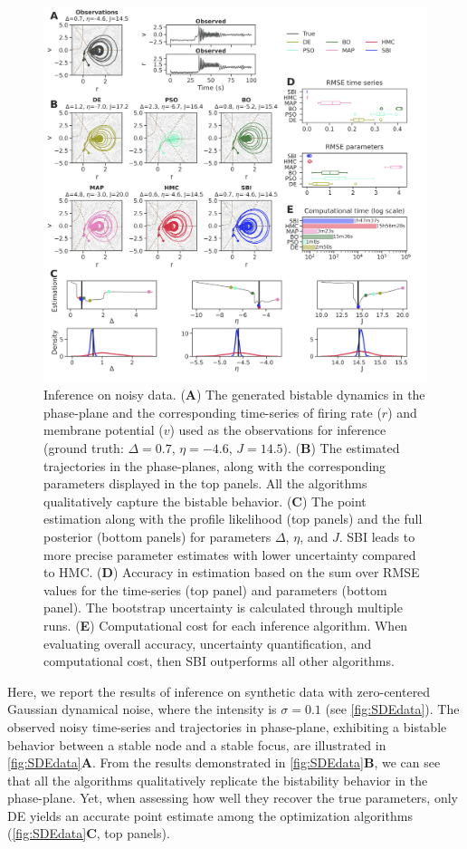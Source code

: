 \documentclass[preprint,11pt,authoryear]{elsarticle}
\begin{document}
\begin{figure}[p]
    \centering
    \includegraphics[width=\linewidth]{Figs/Fig2.png}
    \caption{Inference on noisy data.  (\textbf{A}) The generated bistable dynamics in the phase-plane and the corresponding time-series of firing rate ($r$) and membrane potential ($v$) used as the observations for inference (ground truth: $\Delta=0.7$, $\eta=-4.6$, $J=14.5$).  (\textbf{B}) The estimated trajectories in the phase-planes, along with the corresponding parameters displayed in the top panels. All the algorithms qualitatively capture the bistable behavior. (\textbf{C}) The point estimation along with the profile likelihood (top panels) and the full posterior (bottom panels) for parameters $\Delta$, $\eta$, and $J$. SBI leads to more precise parameter estimates with lower uncertainty compared to HMC. (\textbf{D}) Accuracy in estimation based on the sum over RMSE values for the time-series (top panel) and parameters (bottom panel). The bootstrap uncertainty is calculated through multiple runs. (\textbf{E}) Computational cost for each inference algorithm.  When evaluating overall accuracy, uncertainty quantification, and computational cost, then SBI outperforms all other algorithms.
    }
    \label{fig:SDEdata}
\end{figure}


Here, we report the results of inference on synthetic data with zero-centered Gaussian dynamical noise, where the intensity is $\sigma = 0.1$  (see \autoref{fig:SDEdata}).
The observed noisy time-series and trajectories in phase-plane, exhibiting a bistable behavior between a stable node and a stable focus, are illustrated in \autoref{fig:SDEdata}\textbf{A}. From the results demonstrated in \autoref{fig:SDEdata}\textbf{B}, we can see that all the algorithms qualitatively replicate the bistability behavior in the phase-plane. Yet, when assessing how well they recover the true parameters, only DE yields an accurate point estimate among the optimization algorithms (\autoref{fig:SDEdata}\textbf{C}, top panels). 
\end{document}
